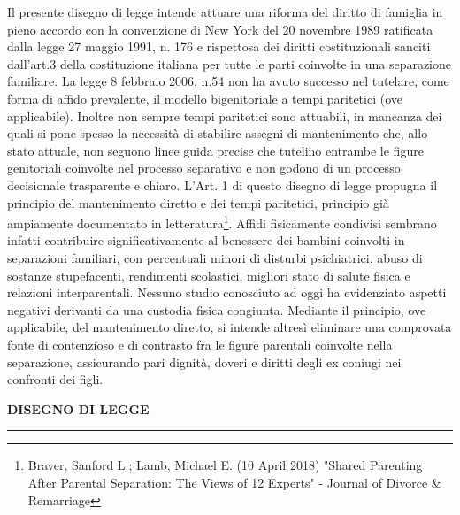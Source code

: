\documentclass[twocolumn,12pt]{article}
\begin{document}
\setlength{\columnseprule}{0.4pt}

\noindent Il presente disegno di legge intende attuare una riforma del diritto di famiglia in pieno accordo con la convenzione di New York del 20 novembre 1989 ratificata dalla legge 27 maggio 1991, n. 176 e rispettosa dei diritti costituzionali sanciti dall'art.3 della costituzione italiana per tutte le parti coinvolte in una separazione familiare.
\bigbreak
La legge 8 febbraio 2006, n.54 non ha avuto successo nel tutelare, come forma di affido prevalente, il modello bigenitoriale a tempi paritetici (ove applicabile). Inoltre non sempre tempi paritetici sono attuabili, in mancanza dei quali si pone spesso la necessità di stabilire assegni di mantenimento che, allo stato attuale, non seguono linee guida precise che tutelino entrambe le figure genitoriali coinvolte nel processo separativo e non godono di un processo decisionale trasparente e chiaro.
\bigbreak
L'Art. 1 di questo disegno di legge pro\-pugna il principio del mantenimento diretto e dei tempi paritetici, principio già ampia\-mente documentato in letteratura\footnote{Braver, Sanford L.; Lamb, Michael E. (10 April 2018) "Shared Parenting After Parental Separation: The Views of 12 Experts" - Journal of Divorce \& Remarriage}. Affidi fisicamente condivisi sembrano infatti contribuire significativamente al benessere dei bambini coinvolti in separazioni familiari, con percentuali minori di disturbi psichiatrici, abuso di sostanze stupefacenti, rendimenti scolastici, migliori stato di salute fisica e relazioni interparentali. Nessuno studio conosciuto ad oggi ha evidenziato aspetti negativi derivanti da una custodia fisica congiunta. Mediante il principio, ove applicabile, del mantenimento diretto, si intende altresì eliminare una comprovata fonte di contenzioso e di contrasto fra le figure parentali coinvolte nella separazione, assicurando pari dignità, doveri e diritti degli ex coniugi nei confronti dei figli.
\bigbreak


\bigbreak
{}

\clearpage

\begin{center}
    \textbf{DISEGNO DI LEGGE}
    \\\noindent\rule{2cm}{0.4pt}
    \smallbreak
\end{center}
\end{document}
